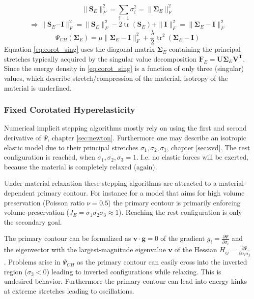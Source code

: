 \documentclass[m,times]{cgMA}
\begin{document}
$$\| \boldsymbol{S}_E \| _ { F }^2 = \sum _ { i = 1 } \sigma _ { i } ^ { 2 } = \| \boldsymbol{\Sigma}_E\|_{F}^2$$
$$\Rightarrow \| \boldsymbol{S}_E\boldsymbol{-I} \| _ { F }^2 = \|\boldsymbol{S}_E \| _ { F }^2 - 2 \operatorname{tr}(\boldsymbol{S}_E)  + \|\boldsymbol{I}\|_{F}^2 = \| \boldsymbol { \Sigma }_E - \boldsymbol { I } \| _ { F } ^ { 2 }$$
\begin{equation} \label{eq:corot_sing}
  \Psi_{CH}(\boldsymbol{\Sigma}_E) = \mu \| \boldsymbol { \Sigma }_E - \boldsymbol { I } \| _ { F } ^ { 2 } + \frac { \lambda } { 2 } \operatorname { tr } ^ { 2 } ( \boldsymbol { \Sigma }_E - \boldsymbol { I } )
\end{equation}
Equation \ref{eq:corot_sing} uses the diagonal matrix $\boldsymbol{\Sigma}_E$ containing the principal stretches typically acquired by the singular value decomposition $\boldsymbol{F}_E \boldsymbol{= U \Sigma}_E\boldsymbol{ V ^T }.$ Since the energy density in \ref{eq:corot_sing} is a function of only three (singular) values, which describe stretch/compression of the material, isotropy of the material is underlined.
\cite{ADAMS:ELASTICITY}
\subsubsection{Fixed Corotated Hyperelasticity}
Numerical implicit stepping algorithms mostly rely on using the first and second derivative of $\Psi$, chapter \ref{sec:newton}. Furthermore one may describe an isotropic elastic model due to their principal stretches $\sigma_1,\sigma_2,\sigma_3$, chapter \ref{sec:svd}. The rest configuration is reached, when $\sigma_1,\sigma_2,\sigma_3 = 1$. I.e. no elastic forces will be exerted, because the material is completely relaxed (again).

Under material relaxation these stepping algorithms are attracted to a material-dependent primary contour. For instance for a model that aims for high volume preservation (Poisson ratio $\nu =0.5$) the primary contour is primarily enforcing volume-preservation ($ J_E = \sigma_1\sigma_2\sigma_3 \approx 1$). Reaching the rest configuration is only the secondary goal.

The primary contour can be formalized as $\boldsymbol{v}\cdot \boldsymbol{g} = 0$ of the gradient $g_i = \frac{\partial \Psi}{\partial \sigma_i}$ and the eigenvector with the largest-magnitude eigenvalue $\boldsymbol{v}$ of the Hessian $H_{ij} = \frac{\partial \Psi}{\partial \sigma_i \sigma_j}$. Problems arise in $\Psi_{CH}$ as the primary contour can easily cross into the inverted region ($\sigma_3 < 0$) leading to inverted configurations while relaxing. This is undesired behavior. Furthermore the primary contour can lead into energy kinks at extreme stretches leading to oscillations.
\end{document}
